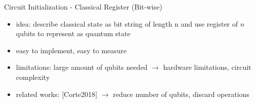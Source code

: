 \begin{frame}[title-small={color=hpiorange, bg=none, text=Implementation}]
	\maketitle
\end{frame}


\begin{frame}{Circuit Initialization - Classical Register (Bit-wise)}
  \begin{minipage}{1.0\textwidth}
    \begin{itemize}
      \item idea: describe classical state as bit string of length n and use register of $n$ qubits to represent as quantum state
      \item easy to implement, easy to measure
      \item limitations: large amount of qubits needed $\rightarrow$ hardware limitations, circuit complexity
      \item related works: [Corte2018] $\rightarrow$ reduce number of qubits, discard operations
    \end{itemize}
  \end{minipage}
\end{frame}


